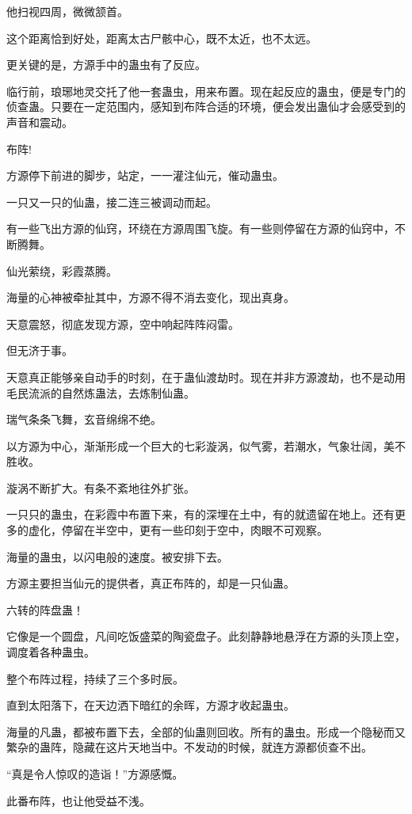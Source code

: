 \begin{this_body}
他扫视四周，微微颔首。

这个距离恰到好处，距离太古尸骸中心，既不太近，也不太远。

更关键的是，方源手中的蛊虫有了反应。

临行前，琅琊地灵交托了他一套蛊虫，用来布置。现在起反应的蛊虫，便是专门的侦查蛊。只要在一定范围内，感知到布阵合适的环境，便会发出蛊仙才会感受到的声音和震动。

布阵!

方源停下前进的脚步，站定，一一灌注仙元，催动蛊虫。

一只又一只的仙蛊，接二连三被调动而起。

有一些飞出方源的仙窍，环绕在方源周围飞旋。有一些则停留在方源的仙窍中，不断腾舞。

仙光萦绕，彩霞蒸腾。

海量的心神被牵扯其中，方源不得不消去变化，现出真身。

天意震怒，彻底发现方源，空中响起阵阵闷雷。

但无济于事。

天意真正能够亲自动手的时刻，在于蛊仙渡劫时。现在并非方源渡劫，也不是动用毛民流派的自然炼蛊法，去炼制仙蛊。

瑞气条条飞舞，玄音绵绵不绝。

以方源为中心，渐渐形成一个巨大的七彩漩涡，似气雾，若潮水，气象壮阔，美不胜收。

漩涡不断扩大。有条不紊地往外扩张。

一只只的蛊虫，在彩霞中布置下来，有的深埋在土中，有的就遗留在地上。还有更多的虚化，停留在半空中，更有一些印刻于空中，肉眼不可观察。

海量的蛊虫，以闪电般的速度。被安排下去。

方源主要担当仙元的提供者，真正布阵的，却是一只仙蛊。

六转的阵盘蛊！

它像是一个圆盘，凡间吃饭盛菜的陶瓷盘子。此刻静静地悬浮在方源的头顶上空，调度着各种蛊虫。

整个布阵过程，持续了三个多时辰。

直到太阳落下，在天边洒下暗红的余晖，方源才收起蛊虫。

海量的凡蛊，都被布置下去，全部的仙蛊则回收。所有的蛊虫。形成一个隐秘而又繁杂的蛊阵，隐藏在这片天地当中。不发动的时候，就连方源都侦查不出。

“真是令人惊叹的造诣！”方源感慨。

此番布阵，也让他受益不浅。


\end{this_body}
